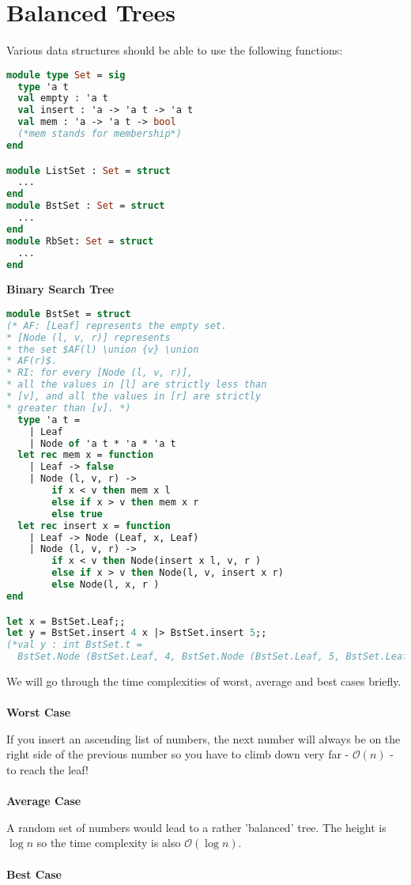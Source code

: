 \documentclass[12pt,a4paper]{article} %
\begin{document}
\section{Balanced Trees}
Various data structures should be able to use the following functions:
\begin{lstlisting}[language=Caml]
module type Set = sig
  type 'a t
  val empty : 'a t
  val insert : 'a -> 'a t -> 'a t
  val mem : 'a -> 'a t -> bool
  (*mem stands for membership*)
end

module ListSet : Set = struct
  ...
end
module BstSet : Set = struct
  ...
end
module RbSet: Set = struct
  ...
end
\end{lstlisting}
\textbf{Binary Search Tree}
\begin{lstlisting}[language=Caml]
module BstSet = struct
(* AF: [Leaf] represents the empty set.
* [Node (l, v, r)] represents
* the set $AF(l) \union {v} \union
* AF(r)$.
* RI: for every [Node (l, v, r)],
* all the values in [l] are strictly less than
* [v], and all the values in [r] are strictly
* greater than [v]. *)
  type 'a t =
    | Leaf
    | Node of 'a t * 'a * 'a t
  let rec mem x = function
    | Leaf -> false
    | Node (l, v, r) ->
        if x < v then mem x l
        else if x > v then mem x r
        else true
  let rec insert x = function
    | Leaf -> Node (Leaf, x, Leaf)
    | Node (l, v, r) ->
        if x < v then Node(insert x l, v, r )
        else if x > v then Node(l, v, insert x r)
        else Node(l, x, r )
end

let x = BstSet.Leaf;;
let y = BstSet.insert 4 x |> BstSet.insert 5;; 
(*val y : int BstSet.t =
  BstSet.Node (BstSet.Leaf, 4, BstSet.Node (BstSet.Leaf, 5, BstSet.Leaf))*)
\end{lstlisting}
We will go through the time complexities of worst, average and best cases briefly.
\\\\
\textbf{Worst Case}

If you insert an ascending list of numbers, the next number will always be on the right side of the previous number so you have to climb down very far - $\mathcal{O}(n)$ - to reach the leaf!
\\\\
\textbf{Average Case}

A random set of numbers would lead to a rather 'balanced' tree. The height is $\log n$ so the time complexity is also $\mathcal{O}(\log n)$.
\\\\
\textbf{Best Case}
\end{document}
